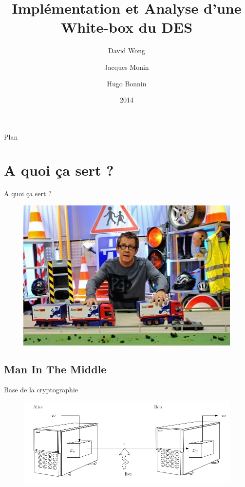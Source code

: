 \documentclass{beamer}
\author{David Wong
  \and Jacques Monin
  \and Hugo Bonnin}
\title{Implémentation et Analyse d'une White-box du DES}
\institute{Université de Bordeaux}
\date{2014}
\begin{document}
\begin{frame}
  \titlepage
\end{frame}


\begin{frame}{Plan}
  \tableofcontents
\end{frame}

\section{A quoi ça sert ?}

\begin{frame}{A quoi ça sert ?}

\begin{figure}[h]
    \centering
    \includegraphics[scale=0.6]{./images/kezako.jpg}
  \end{figure}

\end{frame}

\subsection{Man In The Middle}

\begin{frame}{Base de la cryptographie}

  \begin{figure}[h]
    \centering
    \includegraphics[scale=0.50]{./images/alice_bob.png}
  \end{figure}

\end{frame}
\end{document}
